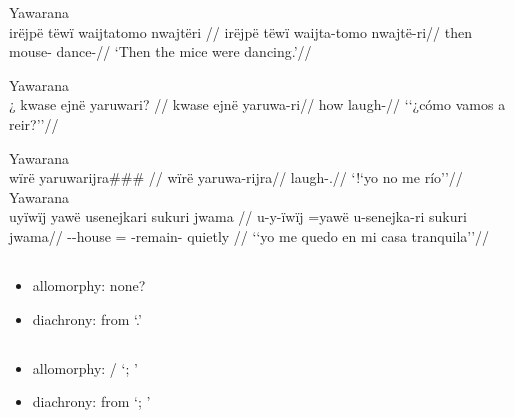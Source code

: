 \documentclass{memoir}
\begin{document}
\ex Yawarana \\
\label{ctorat-16}    \begingl
    \glpreamble irëjpë tëwï waijtatomo nwajtëri //
    \gla irëjpë tëwï waijta-tomo nwajtë-ri//
    \glb then  mouse- dance-//
        \glft ‘Then the mice were dancing.’//  
    \endgl 
\xe

\ex Yawarana \\
\label{convrisamaj-6}    \begingl
    \glpreamble ¿ kwase ejnë yaruwari? //
    \gla kwase ejnë yaruwa-ri//
    \glb how  laugh-//
        \glft ‘‘¿cómo vamos a reir?’’//  
    \endgl 
\xe

\pex\label{gnomicri}    \a Yawarana\\
    \label{convrisamaj-4}        \begingl
        \glpreamble wïrë yaruwarijra\#\#\# //
        \gla wïrë yaruwa-rijra//
        \glb {} laugh-.//
            \glft ‘!‘yo no me río’’//  
        \endgl 
    \a Yawarana\\
    \label{convrisamaj-28}        \begingl
        \glpreamble uyïwïj yawë usenejkari sukuri jwama //
        \gla u-y-ïwïj =yawë u-senejka-ri sukuri jwama//
        \glb {}--house = -remain- quietly //
            \glft ‘‘yo me quedo en mi casa tranquila’’//  
        \endgl 
\xe

\subsection{\texorpdfstring{}{}}

\begin{itemize}
\tightlist
\item
  allomorphy: none?
\item
  diachrony: from  `.' 
\end{itemize}

\subsection{\texorpdfstring{}{}}

\begin{itemize}
\tightlist
\item
  allomorphy: / `; '
\item
  diachrony: from  `; ' 
\end{itemize}
\end{document}
